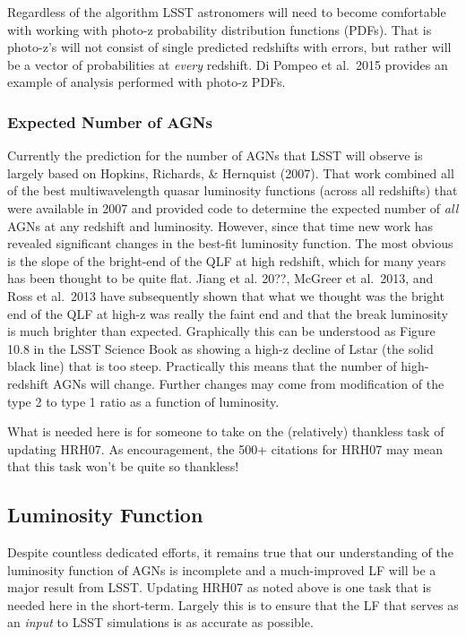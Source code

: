 Regardless of the algorithm LSST astronomers will need to become comfortable with working with photo-z probability distribution functions (PDFs).   That is photo-z's will not consist of single predicted redshifts with errors, but rather will be a vector of probabilities at {\em every} redshift.   Di Pompeo et al.\ 2015 provides an example of analysis performed with photo-z PDFs.


\subsubsection{Expected Number of AGNs}

Currently the prediction for the number of AGNs that LSST will observe is largely based on Hopkins, Richards, \& Hernquist (2007).  That work combined all of the best multiwavelength quasar luminosity functions (across all redshifts) that were available in 2007 and provided code to determine the expected number of {\em all} AGNs at any redshift and luminosity.  However, since that time new work has revealed significant changes in the best-fit luminosity function.  The most obvious is the slope of the bright-end of the QLF at high redshift, which for many years has been thought to be quite flat.  Jiang et al. 20??, McGreer et al.\ 2013, and Ross et al.\ 2013 have subsequently shown that what we thought was the bright end of the QLF at high-z was really the faint end and that the break luminosity is much brighter than expected.   Graphically this can be understood as Figure 10.8 in the LSST Science Book as showing a high-z decline of Lstar (the solid black line) that is too steep.  Practically this means that the number of high-redshift AGNs will change.   Further changes may come from modification of the type 2 to type 1 ratio as a function of luminosity.

What is needed here is for someone to take on the (relatively) thankless task of updating HRH07.  As encouragement, the 500+ citations for HRH07 may mean that this task won't be quite so thankless!


\subsection{Luminosity Function}

Despite countless dedicated efforts, it remains true that our understanding of the luminosity function of AGNs is incomplete and a much-improved LF will be a major result from LSST.  Updating HRH07 as noted above is one task that is needed here in the short-term.  Largely this is to ensure that the LF that serves as an {\em input} to LSST simulations is as accurate as possible.

